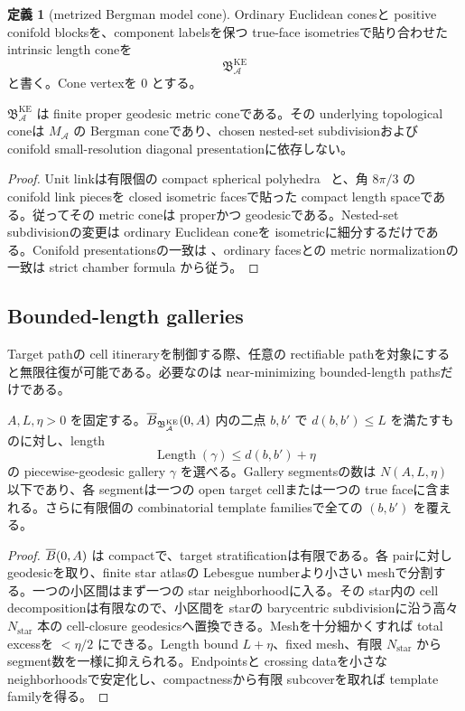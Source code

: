 \documentclass[11pt,a4paper]{ltjsarticle}
\newcommand{\cA}{\mathcal A}\newcommand{\cB}{\mathcal B}\newcommand{\cC}{\mathcal C}
\newcommand{\BKE}{\mathfrak B_{\cA}^{\mathrm{KE}}}
\theoremstyle{plain}
\theoremstyle{definition}
\newtheorem{definition}[theorem]{定義}\newtheorem{hypothesis}[theorem]{仮定}
\theoremstyle{remark}
\begin{document}
\begin{definition}[metrized Bergman model cone]\label{def:metrized-Bergman}
Ordinary Euclidean conesと positive conifold blocksを、component labelsを保つ true-face isometriesで貼り合わせた intrinsic length coneを
\[
 \BKE
\]
と書く。Cone vertexを $0$ とする。
\end{definition}

\begin{proposition}\label{prop:model-properness}
$\BKE$ は finite proper geodesic metric coneである。その underlying topological coneは $M_{\cA}$ の Bergman coneであり、chosen nested-set subdivisionおよび conifold small-resolution diagonal presentationに依存しない。
\end{proposition}

\begin{proof}
Unit linkは有限個の compact spherical polyhedra~\cite{BBI} と、角 $8\pi/3$ の conifold link piecesを closed isometric facesで貼った compact length spaceである。従ってその metric coneは properかつ geodesicである。Nested-set subdivisionの変更は ordinary Euclidean coneを isometricに細分するだけである。Conifold presentationsの一致は 、ordinary facesとの metric normalizationの一致は strict chamber formula  から従う。
\end{proof}

\subsection{Bounded-length galleries}
Target pathの cell itineraryを制御する際、任意の rectifiable pathを対象にすると無限往復が可能である。必要なのは near-minimizing bounded-length pathsだけである。

\begin{proposition}\label{prop:gallery-templates}
$A,L,\eta>0$ を固定する。$\ov B_{\BKE}(0,A)$ 内の二点 $b,b'$ で $d(b,b')\le L$ を満たすものに対し、length
\[
 \operatorname{Length}(\gamma)\le d(b,b')+\eta
\]
の piecewise-geodesic gallery $\gamma$ を選べる。Gallery segmentsの数は $N(A,L,\eta)$ 以下であり、各 segmentは一つの open target cellまたは一つの true faceに含まれる。さらに有限個の combinatorial template familiesで全ての $(b,b')$ を覆える。
\end{proposition}

\begin{proof}
$\overline B(0,A)$ は compactで、target stratificationは有限である。各 pairに対し geodesicを取り、finite star atlasの Lebesgue numberより小さい meshで分割する。一つの小区間はまず一つの star neighborhoodに入る。その star内の cell decompositionは有限なので、小区間を starの barycentric subdivisionに沿う高々 $N_{\mathrm{star}}$ 本の cell-closure geodesicsへ置換できる。Meshを十分細かくすれば total excessを $<\eta/2$ にできる。Length bound $L+\eta$、fixed mesh、有限 $N_{\mathrm{star}}$ から segment数を一様に抑えられる。Endpointsと crossing dataを小さな neighborhoodsで安定化し、compactnessから有限 subcoverを取れば template familyを得る。
\end{proof}
\end{document}
